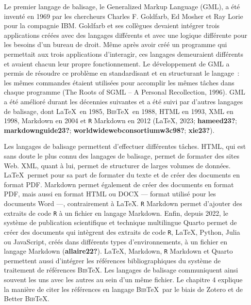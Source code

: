 \documentclass[
  letterpaper,
  DIV=11,
  numbers=noendperiod]{scrreprt}
\begin{document}
Le premier langage de balisage, le Generalized Markup Language (GML), a
été inventé en 1969 par les chercheurs Charles F. Goldfarb, Ed Mosher et
Ray Lorie pour la compagnie IBM. Goldfarb et ses collègues devaient
intégrer trois applications créées avec des langages différents et avec
une logique différente pour les besoins d'un bureau de droit. Même après
avoir créé un programme qui permettait aux trois applications
d'interagir, ces langages demeuraient différents et avaient chacun leur
propre fonctionnement. Le développement de GML a permis de résoudre ce
problème en standardisant et en structurant le langage~: les mêmes
commandes étaient utilisées pour accomplir les mêmes tâches dans chaque
programme (The {Roots} of {SGML} -- {A Personal Recollection}, 1996).
GML a été amélioré durant les décennies suivantes et a été suivi par
d'autres langages de balisage, dont \LaTeX~en 1985, \textsc{Bib}\TeX~en
1988, HTML en 1993, XML en 1998, Markdown en 2004 et \texttt{R} Markdown
en 2012 ({LaTeX}, 2023; \textbf{hameed23?}; \textbf{markdownguide23?};
\textbf{worldwidewebconsortiumw3c98?}; \textbf{xie23?}).

Les langages de balisage permettent d'effectuer différentes tâches.
HTML, qui est sans doute le plus connu des langages de balisage, permet
de formater des sites Web. XML, quant à lui, permet de structurer de
larges volumes de données. \LaTeX~permet pour sa part de formater du
texte et de créer des documents en format PDF. Markdown permet également
de créer des documents en format PDF, mais aussi en format HTML ou DOCX
--- format utilisé pour les documents Word ---, contrairement à \LaTeX.
\texttt{R} Markdown permet d'ajouter des extraits de code \texttt{R} à
un fichier en langage Markdown. Enfin, depuis 2022, le système de
publication scientifique et technique multilingue Quarto permet de créer
des documents qui intègrent des extraits de code \texttt{R}, \LaTeX,
Python, Julia ou JavaScript, créés dans différents types
d'environnements, à un fichier en langage Markdown
(\textbf{allaire22?}). \LaTeX, Markdown, \texttt{R} Markdown et Quarto
permettent aussi d'intégrer les références bibliographiques du système
de traitement de références \textsc{Bib}\TeX. Les langages de balisage
communiquent ainsi souvent les uns avec les autres au sein d'un même
fichier. Le chapitre 4 explique la manière de citer les références en
langage \textsc{Bib}\TeX~par le biais de Zotero et de Better
\textsc{Bib}\TeX.
\end{document}
